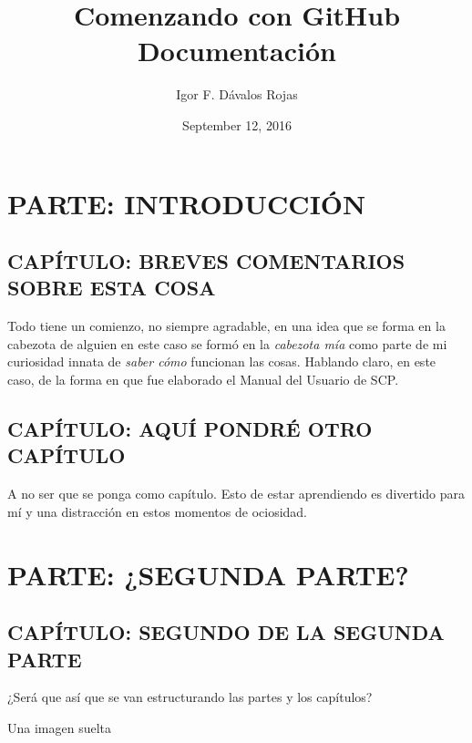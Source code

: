 \documentclass[letterpaper,10pt,english]{sphinxmanual}
\title{Comenzando con GitHub Documentación}
\date{September 12, 2016}
\author{Igor F. Dávalos Rojas}
\begin{document}
\maketitle
\tableofcontents
{}\label{index::doc}



\part{PARTE: INTRODUCCIÓN}
\label{introduccion:introduccion}\label{introduccion:parte-introduccion}\label{introduccion:welcome-to-comenzando-con-github-s-documentation}\label{introduccion::doc}

\chapter{CAPÍTULO: BREVES COMENTARIOS SOBRE ESTA COSA}
\label{introduccion:capitulo-breves-comentarios-sobre-esta-cosa}\label{introduccion:capitulo1}
Todo tiene un comienzo, no siempre agradable, en una idea que se forma en la cabezota de alguien
en este caso se formó en la \emph{cabezota mía} como parte de mi curiosidad innata de \emph{saber cómo} funcionan las cosas.
Hablando claro, en este caso, de la forma en que fue elaborado el Manual del Usuario de SCP.


\chapter{CAPÍTULO: AQUÍ PONDRÉ OTRO CAPÍTULO}
\label{introduccion:capitulo2}\label{introduccion:capitulo-aqui-pondre-otro-capitulo}
A no ser que se ponga como capítulo. Esto de estar aprendiendo es divertido para mí y una distracción en estos momentos de ociosidad.


\part{PARTE: ¿SEGUNDA PARTE?}
\label{introduccion:parte-segunda-parte}\label{introduccion:segundaparte}

\chapter{CAPÍTULO: SEGUNDO DE LA SEGUNDA PARTE}
\label{introduccion:capitulo-segundo-de-la-segunda-parte}\label{introduccion:capitulo1-2}
¿Será que así que se van estructurando las partes y los capítulos?

Una imagen suelta
\end{document}
